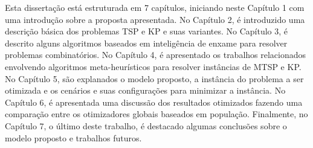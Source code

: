 Esta dissertação está estruturada em 7 capítulos, iniciando neste Capítulo 1 com uma introdução sobre a proposta apresentada. No Capítulo 2, é introduzido uma descrição básica dos problemas TSP e KP e suas variantes. No Capítulo 3, é descrito alguns algoritmos baseados em inteligência de enxame para resolver problemas combinatórios. No Capítulo 4, é apresentado os trabalhos relacionados envolvendo algoritmos meta-heurísticos para resolver instâncias de MTSP e KP. No Capítulo 5, são explanados o modelo proposto, a instância do problema a ser otimizada e os cenários e suas configurações para minimizar a instância. No Capítulo 6, é apresentada uma discussão dos resultados otimizados fazendo uma comparação entre os otimizadores globais baseados em população. Finalmente, no Capítulo 7, o último deste trabalho, é destacado algumas conclusões sobre o modelo proposto e trabalhos futuros.